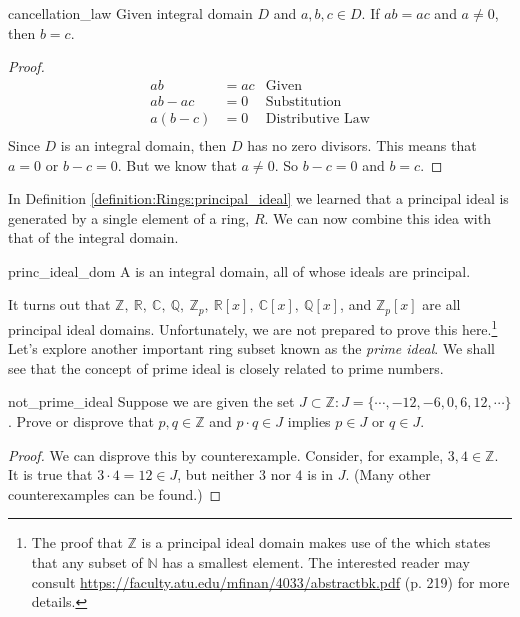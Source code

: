 \begin{prop}{cancellation_law}
Given integral domain $D$ and $a,b,c\in D$.  If $ab=ac$ and $a\neq 0$, then $b=c$.

\begin{proof}
\begin{align*}
    ab&=ac & \text{Given}\\
    ab-ac&=0 & \text{Substitution}\\
    a(b-c)&=0 & \text{Distributive Law}\\
\end{align*}
Since $D$ is an integral domain, then $D$ has no zero divisors.  This means that $a=0$ or $b-c=0$.  But we know that $a\neq 0$.  So $b-c=0$ and $b=c$.
\end{proof}
\end{prop}


In Definition \ref{definition:Rings:principal_ideal} we learned that a principal ideal is generated by a single element of a ring, $R$.  We can now combine this idea with that of the integral domain.

\begin{defn}{princ_ideal_dom}
A  is an integral domain, all of whose ideals are principal.
\end{defn}

It turns out that ${\mathbb Z},~{\mathbb R},~{\mathbb C},~{\mathbb Q},~{\mathbb Z}_p,~{\mathbb R}[x],~{\mathbb C}[x],~{\mathbb Q}[x]$, and ${\mathbb Z}_p[x]$ are all principal ideal domains.  Unfortunately, we are not prepared to prove this here.\footnote{The proof that ${\mathbb Z}$ is a principal ideal domain makes use of the  which states that any subset of ${\mathbb N}$ has a smallest element.  The interested reader may consult \url{https://faculty.atu.edu/mfinan/4033/abstractbk.pdf} (p. 219) for more details.}\\

Let's explore another important ring subset known as the \emph{prime ideal}.  We shall see that the concept of prime ideal is closely related to prime numbers.


\begin{example}{not_prime_ideal}
Suppose we are given the set $J\subset{\mathbb Z}:J=\{\cdots,-12,-6,0,6,12,\cdots\}$.  Prove or disprove that $p,q\in{\mathbb Z}$ and $p\cdot q\in J$ implies $p\in J$ or $q\in J$. 
\end{example}

\begin{proof}
We can disprove this by counterexample.  Consider, for example, $3,4\in{\mathbb Z}$.  It is true that $3\cdot 4=12\in J$, but neither $3$ nor $4$ is in $J$.  (Many other counterexamples can be found.)
\end{proof}

